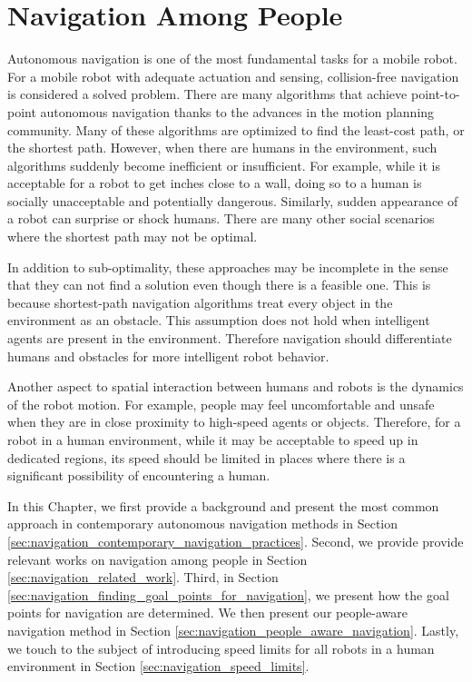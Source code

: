 

\chapter{Navigation Among People}
\label{chapter:navigation_among_people}

Autonomous navigation is one of the most fundamental tasks for a mobile robot. For a mobile robot with adequate actuation and sensing, collision-free navigation is considered a solved problem. There are many algorithms that achieve point-to-point autonomous navigation thanks to the advances in the motion planning community. Many of these algorithms are optimized to find the least-cost path, or the shortest path. However, when there are humans in the environment, such algorithms suddenly become inefficient or insufficient. For example, while it is acceptable for a robot to get inches close to a wall, doing so to a human is socially unacceptable and potentially dangerous. Similarly, sudden appearance of a robot can surprise or shock humans. There are many other social scenarios where the shortest path may not be optimal. 

In addition to sub-optimality, these approaches may be incomplete in the sense that they can not find a solution even though there is a feasible one. This is because shortest-path navigation algorithms treat every object in the environment as an obstacle. This assumption does not hold when intelligent agents are present in the environment. Therefore navigation should differentiate humans and obstacles for more intelligent robot behavior.

Another aspect to spatial interaction between humans and robots is the dynamics of the robot motion. For example, people may feel uncomfortable and unsafe when they are in close proximity to high-speed agents or objects. Therefore, for a robot in a human environment, while it may be acceptable to speed up in dedicated regions, its speed should be limited in places where there is a significant possibility of encountering a human.

In this Chapter, we first provide a background and present the most common approach in contemporary autonomous navigation methods in Section \ref{sec:navigation_contemporary_navigation_practices}. Second, we provide provide relevant works on navigation among people in Section \ref{sec:navigation_related_work}. Third, in Section \ref{sec:navigation_finding_goal_points_for_navigation}, we present how the goal points for navigation are determined. We then present our people-aware navigation method in Section \ref{sec:navigation_people_aware_navigation}. Lastly, we touch to the subject of introducing speed limits for all robots in a human environment in Section \ref{sec:navigation_speed_limits}.



